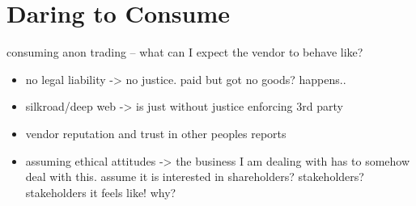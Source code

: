 \section{Daring to Consume}

consuming anon trading -- what can I expect the vendor to behave like?
\begin{itemize}
    \item no legal liability -> no justice. paid but got no goods? happens..
    \item silkroad/deep web -> is just without justice enforcing 3rd party
    \item vendor reputation and trust in other peoples reports
    \item assuming ethical attitudes -> the business I am dealing with has to somehow deal with this. assume it is interested in shareholders? stakeholders? stakeholders it feels like! why? 
\end{itemize}
